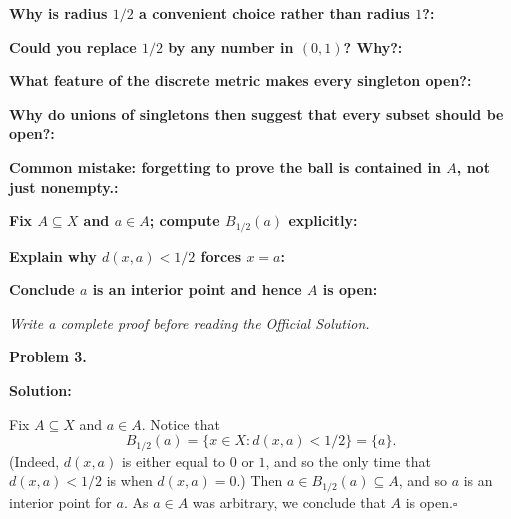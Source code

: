 \documentclass[12pt]{article}
\newcommand{\fillfield}[1]{%
  \par\noindent\textbf{#1:}\enspace\hrulefill\par\vspace{3pt}%
}
\newcommand{\writespace}[1]{\vspace{#1}}
\begin{document}
\bigskip

\begin{tcolorbox}[
  enhanced, breakable,
  colback  = pass3orange,
  colframe = orange!65!black,
  fonttitle = \bfseries,
  title = {Pass 3 \enspace\textbf{--}\enspace Self-Explanation}
]
\fillfield{Why is radius $1/2$ a convenient choice rather than radius $1$?}
\fillfield{Could you replace $1/2$ by any number in $(0,1)$? Why?}
\fillfield{What feature of the discrete metric makes every singleton open?}
\fillfield{Why do unions of singletons then suggest that every subset should be open?}
\fillfield{Common mistake: forgetting to prove the ball is contained in $A$, not just nonempty.}
\end{tcolorbox}

\newpage

\begin{tcolorbox}[
  enhanced, breakable,
  colback  = pass4purple,
  colframe = purple!55!black,
  fonttitle = \bfseries,
  title = {Pass 4 \enspace\textbf{--}\enspace Skeleton Proof}
]
\noindent\textbf{Fix $A\subseteq X$ and $a\in A$; compute $B_{1/2}(a)$ explicitly:}\par
\writespace{1.6cm}
\noindent\textbf{Explain why $d(x,a)<1/2$ forces $x=a$:}\par
\writespace{1.2cm}
\noindent\textbf{Conclude $a$ is an interior point and hence $A$ is open:}\par
\writespace{1.0cm}
\end{tcolorbox}

\newpage

\begin{tcolorbox}[
  enhanced, breakable,
  colback  = pass5gray,
  colframe = black!38,
  fonttitle = \bfseries,
  title = {Pass 5 \enspace\textbf{--}\enspace Full Proof Attempt}
]
\small\itshape Write a complete proof before reading the Official Solution.\par
\normalfont\normalsize
\writespace{19cm}
\end{tcolorbox}

\newpage

\begin{tcolorbox}[
  enhanced, breakable,
  colback  = solgreen,
  colframe = green!45!black,
  fonttitle = \bfseries,
  title = {\textsc{Official Solution}\hfill Homework 8 -- Selected Solutions}
]
\textbf{Problem 3.}

\medskip\textbf{Solution:}

\medskip
Fix $A \subseteq X$ and $a \in A$. Notice that
\[
  B_{1/2}(a) = \{x \in X : d(x, a) < 1/2\} = \{a\}.
\]
(Indeed, $d(x, a)$ is either equal to $0$ or $1$, and so the only time that $d(x, a) < 1/2$ is when
$d(x, a) = 0$.) Then $a \in B_{1/2}(a) \subseteq A$, and so $a$ is an interior point for $a$.
As $a \in A$ was arbitrary, we conclude that $A$ is open.\hfill$\square$
\end{tcolorbox}
\end{document}
